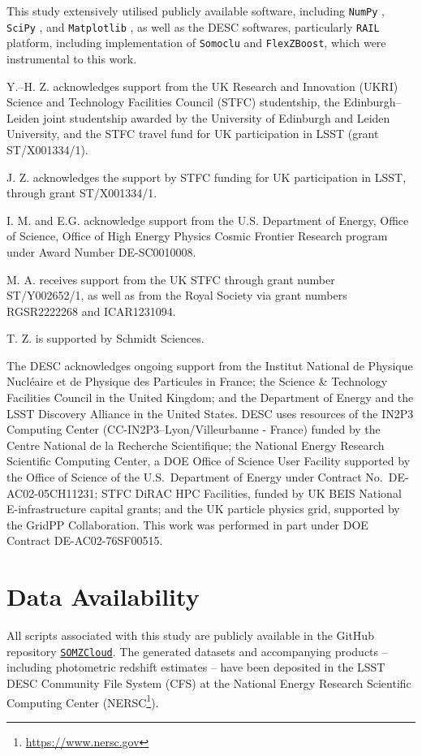 \documentclass[fleqn, usenatbib]{mnras}
\begin{document}
This study extensively utilised publicly available software, including \texttt{NumPy} \citep{2020Natur.585..357H}, \texttt{SciPy} \citep{2020NatMe..17..261V}, and \texttt{Matplotlib} \citep{2007CSE.....9...90H}, as well as the DESC softwares, particularly \texttt{RAIL} platform, including implementation of \texttt{Somoclu} and \texttt{FlexZBoost}, which were instrumental to this work.

Y.–H. Z. acknowledges support from the UK Research and Innovation (UKRI) Science and Technology Facilities Council (STFC) studentship, the Edinburgh–Leiden joint studentship awarded by the University of Edinburgh and Leiden University, and the STFC travel fund for UK participation in LSST (grant ST/X001334/1). 

J. Z. acknowledges the support by STFC funding for UK participation in LSST, through grant ST/X001334/1.

I. M. and E.G. acknowledge support from the U.S. Department of Energy, Office of Science, Office of High Energy Physics Cosmic Frontier Research program under Award Number DE-SC0010008.

M. A. receives support from the UK STFC through grant number ST/Y002652/1, as well as from the Royal Society via grant numbers RGSR2222268 and ICAR1231094.

T. Z. is supported by Schmidt Sciences.

The DESC acknowledges ongoing support from the Institut National de Physique Nucl\'eaire et de Physique des Particules in France; the Science \& Technology Facilities Council in the United Kingdom; and the Department of Energy and the LSST Discovery Alliance in the United States.  DESC uses resources of the IN2P3 Computing Center (CC-IN2P3--Lyon/Villeurbanne - France) funded by the Centre National de la Recherche Scientifique; the National Energy Research Scientific Computing Center, a DOE Office of Science User Facility supported by the Office of Science of the U.S.\ Department of Energy under Contract No.\ DE-AC02-05CH11231; STFC DiRAC HPC Facilities, funded by UK BEIS National E-infrastructure capital grants; and the UK particle physics grid, supported by the GridPP Collaboration. This work was performed in part under DOE Contract DE-AC02-76SF00515.

\section*{Data Availability}

All scripts associated with this study are publicly available in the GitHub repository \href{https://github.com/CosmoCloudZhang/SOMZCloud.git}{\faGithub \texttt{SOMZCloud}}. The generated datasets and accompanying products -- including photometric redshift estimates -- have been deposited in the LSST DESC Community File System (CFS) at the National Energy Research Scientific Computing Center (NERSC\footnote{\url{https://www.nersc.gov}}).






\bsp
\label{lastpage}
\end{document}
